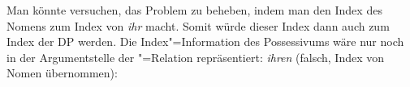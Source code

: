 \noindent
Man könnte versuchen, das Problem zu beheben, indem man den Index
des Nomens zum Index von \emph{ihr} macht. Somit würde dieser Index
dann auch zum Index der DP werden. Die Index"=Information des Possessivums
wäre nur noch in der Argumentstelle der "=Relation
repräsentiert:
\eas
\textit{ihren} (falsch, Index von Nomen übernommen):\\
\zs

